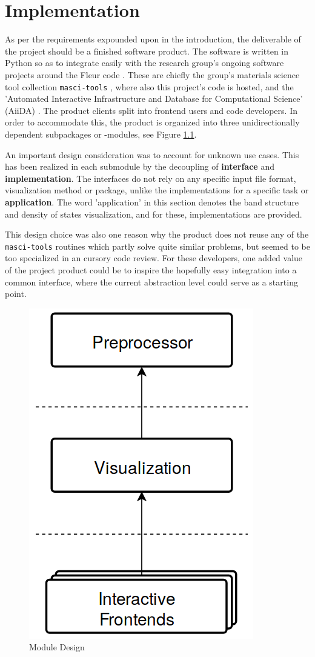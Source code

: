 
\chapter{Implementation}
\label{chap:implementation}


As per the requirements expounded upon in the introduction, the deliverable of
the project should be a finished software product. The software is written in
Python so as to integrate easily with the research group's ongoing software
projects around the Fleur code \cite{fleur}. These are chiefly the group's
materials science tool collection \texttt{masci-tools} \cite{masci-tools} ,
where also this project's code is hosted, and the 'Automated Interactive
Infrastructure and Database for Computational Science' (AiiDA) \cite{aiida}. The
product clients split into frontend users and code developers. In order to
accommodate this, the product is organized into three unidirectionally dependent
subpackages or -modules, see Figure \ref{fig:modules}.

An important design consideration was to account for unknown use cases. This has
been realized in each submodule by the decoupling of \textbf{interface} and
\textbf{implementation}. The interfaces do not rely on any specific input file
format, visualization method or package, unlike the implementations for a
specific task or \textbf{application}. The word 'application' in this section
denotes the band structure and density of states visualization, and for these,
implementations are provided.

This design choice was also one reason why the product does not reuse any of the
\texttt{masci-tools} routines which partly solve quite similar problems, but
seemed to be too specialized in an cursory code review. For these developers,
one added value of the project product could be to inspire the hopefully easy
integration into a common interface, where the current abstraction level could
serve as a starting point.

\begin{figure}[htb!]
    \centering
    \includegraphics[width=0.3\linewidth]{img/module_design.png}
    \caption{Module Design}
    \label{fig:modules}
\end{figure}

